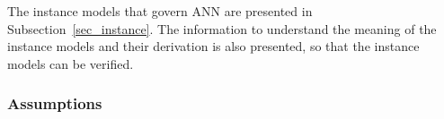 \documentclass[12pt]{article}
\begin{document}


The instance models that govern ANN are presented in
Subsection~\ref{sec_instance}.  The information to understand the meaning of the
instance models and their derivation is also presented, so that the instance
models can be verified.






\subsubsection{Assumptions} \label{sec_assumpt}

\end{document}
